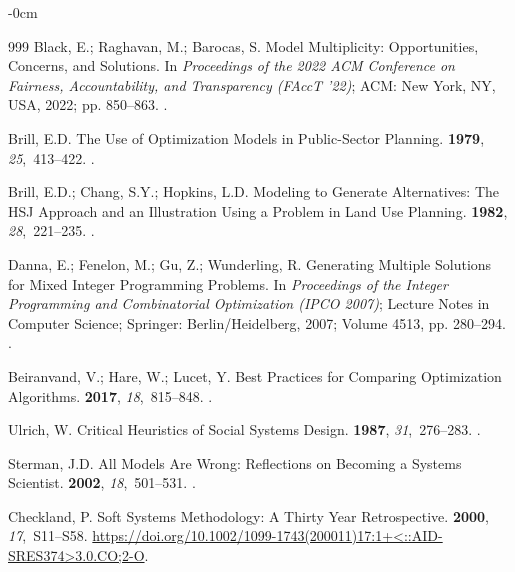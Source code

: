 \documentclass[systems,article,accept,moreauthors,pdftex]{Definitions/mdpi}
\begin{document}
\begin{adjustwidth}{-\extralength}{0cm}
\begin{thebibliography}{999}
Black, E.; Raghavan, M.; Barocas, S.
\newblock Model Multiplicity: Opportunities, Concerns, and Solutions.
\newblock In \emph{Proceedings of the 2022 ACM Conference on
  Fairness, Accountability, and Transparency (FAccT '22)}; ACM: New York, NY, USA,
  2022; pp. 850--863.
.

Brill, E.D.
\newblock The Use of Optimization Models in Public-Sector Planning.
 {\bf 1979}, {\em 25},~413--422.
.

Brill, E.D.; Chang, S.Y.; Hopkins, L.D.
\newblock Modeling to Generate Alternatives: The {HSJ} Approach and an
  Illustration Using a Problem in Land Use Planning.
 {\bf 1982}, {\em 28},~221--235.
.

Danna, E.; Fenelon, M.; Gu, Z.; Wunderling, R.
\newblock Generating Multiple Solutions for Mixed Integer Programming Problems.
\newblock In \emph{Proceedings of the Integer Programming and Combinatorial
  Optimization (IPCO 2007)}; Lecture   Notes in Computer Science; Springer: Berlin/Heidelberg,  2007; Volume 4513, pp. 280--294.
.

Beiranvand, V.; Hare, W.; Lucet, Y.
\newblock Best Practices for Comparing Optimization Algorithms.
 {\bf 2017}, {\em 18},~815--848.
.

Ulrich, W.
\newblock Critical Heuristics of Social Systems Design.
 {\bf 1987}, {\em
  31},~276--283.
.

Sterman, J.D.
\newblock All Models Are Wrong: Reflections on Becoming a Systems Scientist.
 {\bf 2002}, {\em 18},~501--531.
.

Checkland, P.
\newblock Soft Systems Methodology: A Thirty Year Retrospective.
 {\bf 2000}, {\em
  17},~S11--S58.
\newblock
  {\url{https://doi.org/10.1002/1099-1743(200011)17:1+<::AID-SRES374>3.0.CO;2-O}}.


\end{thebibliography}
\end{adjustwidth}
\end{document}
